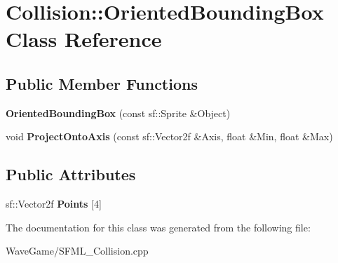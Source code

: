 \hypertarget{class_collision_1_1_oriented_bounding_box}{}\section{Collision\+:\+:Oriented\+Bounding\+Box Class Reference}
\label{class_collision_1_1_oriented_bounding_box}
\subsection*{Public Member Functions}
\begin{DoxyCompactItemize}
\item 
\mbox{\label{class_collision_1_1_oriented_bounding_box_a26843fcb012e9443bf59b37b0c889f6d}} 
{\bfseries Oriented\+Bounding\+Box} (const sf\+::\+Sprite \&Object)
\item 
\mbox{\label{class_collision_1_1_oriented_bounding_box_af0764443fbcd83ed565f40feff5904b3}} 
void {\bfseries Project\+Onto\+Axis} (const sf\+::\+Vector2f \&Axis, float \&Min, float \&Max)
\end{DoxyCompactItemize}
\subsection*{Public Attributes}
\begin{DoxyCompactItemize}
\item 
\mbox{\label{class_collision_1_1_oriented_bounding_box_a7b780d99d599073a85ed2d56264b4775}} 
sf\+::\+Vector2f {\bfseries Points} \mbox{[}4\mbox{]}
\end{DoxyCompactItemize}


The documentation for this class was generated from the following file\+:\begin{DoxyCompactItemize}
\item 
Wave\+Game/S\+F\+M\+L\+\_\+\+Collision.\+cpp\end{DoxyCompactItemize}

